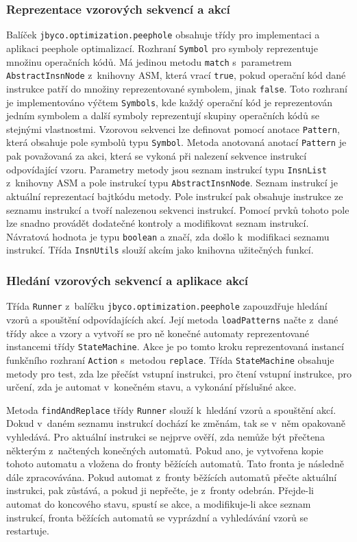 \subsubsection{Reprezentace vzorových sekvencí a akcí}

Balíček \texttt{jbyco.optimization.peephole} obsahuje třídy pro implementaci a aplikaci peephole optimalizací. Rozhraní \texttt{Symbol} pro symboly reprezentuje množinu operačních kódů. Má jedinou metodu \texttt{match} s~parametrem \texttt{AbstractInsnNode} z~knihovny ASM, která vrací \texttt{true}, pokud operační kód dané instrukce patří do množiny reprezentované symbolem, jinak \texttt{false}. Toto rozhraní je implementováno výčtem \texttt{Symbols}, kde každý operační kód je reprezentován jedním symbolem a další symboly reprezentují skupiny operačních kódů se stejnými vlastnostmi. Vzorovou sekvenci lze definovat pomocí anotace \texttt{Pattern}, která obsahuje pole symbolů typu \texttt{Symbol}. Metoda anotovaná anotací \texttt{Pattern} je pak považovaná za akci, která se vykoná při nalezení sekvence instrukcí odpovídající vzoru. Parametry metody jsou seznam instrukcí typu \texttt{InsnList} z~knihovny ASM a pole instrukcí typu \texttt{AbstractInsnNode}. Seznam instrukcí je aktuální reprezentací bajtkódu metody. Pole instrukcí pak obsahuje instrukce ze seznamu instrukcí a tvoří nalezenou sekvenci instrukcí. Pomocí prvků tohoto pole lze snadno provádět dodatečné kontroly a modifikovat seznam instrukcí. Návratová hodnota je typu \texttt{boolean} a značí, zda došlo k~modifikaci seznamu instrukcí. Třída \texttt{InsnUtils} slouží akcím jako knihovna užitečných funkcí.

\subsubsection{Hledání vzorových sekvencí a aplikace akcí}

Třída \texttt{Runner} z~balíčku \texttt{jbyco.optimization.peephole} zapouzdřuje hledání vzorů a spouštění odpovídajících akcí. Její metoda \texttt{loadPatterns} načte z~dané třídy akce a vzory a vytvoří se pro ně konečné automaty reprezentované instancemi třídy \texttt{StateMachine}. Akce je po tomto kroku reprezentovaná instancí funkčního rozhraní \texttt{Action} s~metodou \texttt{replace}. Třída \texttt{StateMachine} obsahuje metody pro test, zda lze přečíst vstupní instrukci, pro čtení vstupní instrukce, pro určení, zda je automat v~konečném stavu, a vykonání příslušné akce. 

Metoda \texttt{findAndReplace} třídy \texttt{Runner} slouží k~hledání vzorů a spouštění akcí. Dokud v~daném seznamu instrukcí dochází ke změnám, tak se v~něm opakovaně vyhledává. Pro aktuální instrukci se nejprve ověří, zda nemůže být přečtena některým z~načtených konečných automatů. Pokud ano, je vytvořena kopie tohoto automatu a vložena do fronty běžících automatů. Tato fronta je následně dále zpracovávána. Pokud automat z~fronty běžících automatů přečte aktuální instrukci, pak zůstává, a pokud ji nepřečte, je z~fronty odebrán. Přejde-li automat do koncového stavu, spustí se akce, a modifikuje-li akce seznam instrukcí, fronta běžících automatů se vyprázdní a vyhledávání vzorů se restartuje.

